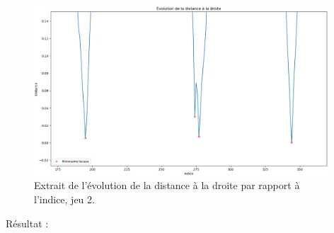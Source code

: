 \documentclass[12pt]{article}
\begin{document}
    \begin{figure}[ht!]
        \centering
        \includegraphics[width=0.98\textwidth]{Images/PseudoProf_dist_2.png}  
        \caption{\label{pp_2} Extrait de l'évolution de la distance à la droite par rapport à l'indice, jeu 2.}
    \end{figure}
    \newpage
    Résultat :
\end{document}
